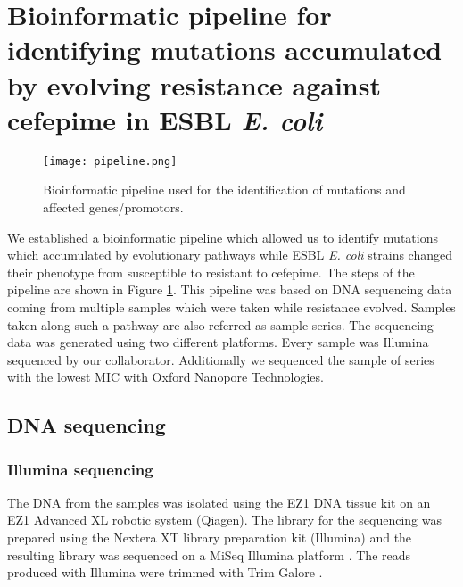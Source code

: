 \section{Bioinformatic pipeline for identifying mutations accumulated by evolving resistance against cefepime in ESBL \textit{E. coli}}
\label{section:pipeline}
\begin{figure}
	\texttt{[image: pipeline.png]}
	\caption{Bioinformatic pipeline used for the identification of mutations and affected genes/promotors.}
	\label{figure:pipeline}
\end{figure}
We established a bioinformatic pipeline which allowed us to identify mutations which accumulated by evolutionary pathways while ESBL \textit{E. coli} strains changed their phenotype from susceptible to resistant to cefepime. The steps of the pipeline are shown in Figure \ref{figure:pipeline}. This pipeline was based on DNA sequencing data coming from multiple samples which were taken while resistance evolved. Samples taken along such a pathway are also referred as sample series. The sequencing data was generated using two different platforms. Every sample was Illumina sequenced by our collaborator. Additionally we sequenced the sample of series with the lowest MIC with Oxford Nanopore Technologies.
\subsection{DNA sequencing}
\subsubsection{Illumina sequencing}
The DNA from the samples was isolated using the EZ1 DNA tissue kit on an EZ1 Advanced XL robotic system (Qiagen). The library for the sequencing was prepared using the Nextera XT library preparation kit (Illumina) and the resulting library was sequenced on a MiSeq Illumina platform \cite{nanopore}. The reads produced with Illumina were trimmed with Trim Galore \cite{noauthor_babraham_nodate}.
\label{section:illumina}
